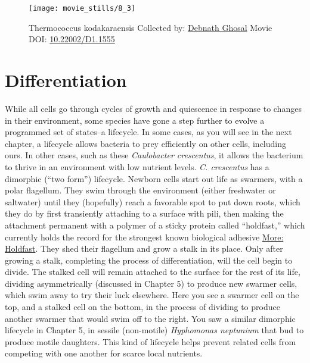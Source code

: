\documentclass[]{tufte-book}
\begin{document}
\begin{figure}
\texttt{[image: movie\_stills/8\_3]} \caption[Thermococcus kodakaraensis Collected by:
\protect\hyperlink{debnath_ghosal}{Debnath Ghosal} Movie DOI:
\href{https://doi.org/10.22002/D1.1555}{10.22002/D1.1555}]{Thermococcus kodakaraensis Collected by:
\protect\hyperlink{debnath_ghosal}{Debnath Ghosal} Movie DOI:
\href{https://doi.org/10.22002/D1.1555}{10.22002/D1.1555}}\label{fig:8-3}
\end{figure}

\section{Differentiation}\label{differentiation}

While all cells go through cycles of growth and quiescence in response
to changes in their environment, some species have gone a step further
to evolve a programmed set of states--a lifecycle. In some cases, as you
will see in the next chapter, a lifecycle allows bacteria to prey
efficiently on other cells, including ours. In other cases, such as
these \emph{Caulobacter crescentus}, it allows the bacterium to thrive
in an environment with low nutrient levels. \emph{C. crescentus} has a
dimorphic (``two form'') lifecycle. Newborn cells start out life as
swarmers, with a polar flagellum. They swim through the environment
(either freshwater or saltwater) until they (hopefully) reach a
favorable spot to put down roots, which they do by first transiently
attaching to a surface with pili, then making the attachment permanent
with a polymer of a sticky protein called ``holdfast,'' which currently
holds the record for the strongest known biological adhesive
\protect\hyperlink{Holdfast}{More: Holdfast}. They shed their flagellum
and grow a stalk in its place. Only after growing a stalk, completing
the process of differentiation, will the cell begin to divide. The
stalked cell will remain attached to the surface for the rest of its
life, dividing asymmetrically (discussed in Chapter 5) to produce new
swarmer cells, which swim away to try their luck elsewhere. Here you see
a swarmer cell on the top, and a stalked cell on the bottom, in the
process of dividing to produce another swarmer that would swim off to
the right. You saw a similar dimorphic lifecycle in Chapter 5, in
sessile (non-motile) \emph{Hyphomonas neptunium} that bud to produce
motile daughters. This kind of lifecycle helps prevent related cells
from competing with one another for scarce local nutrients.
\end{document}

